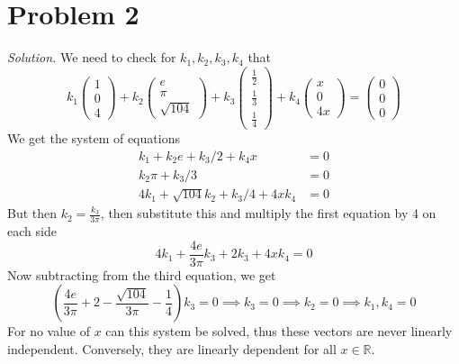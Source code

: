 \documentclass{article}
\begin{document}
\section*{Problem 2}
\emph{Solution. }We need to check for $k_1, k_2, k_3, k_4$ that
\begin{equation*}
    k_{1}\begin{pmatrix}
        1\\
        0\\
        4
    \end{pmatrix} + k_{2}\begin{pmatrix}
        e\\
        \pi \\
        \sqrt{104}
    \end{pmatrix} + k_{3}\begin{pmatrix}
        \frac{1}{2}\\
        \frac{1}{3} \\
        \frac{1}{4}
    \end{pmatrix}  + k_{4}\begin{pmatrix}
        x\\
        0 \\
        4x
    \end{pmatrix} = \begin{pmatrix}
        0\\
        0\\
        0
    \end{pmatrix}
\end{equation*}
We get the system of equations
\begin{align*}
    k_{1} + k_{2}e + k_3/2 + k_{4}x &= 0\\
    k_{2}\pi + k_{3}/3 &= 0\\
    4k_{1} + \sqrt{104}k_{2} + k_{3}/4 + 4xk_{4} &= 0
\end{align*}
But then $k_{2} = \frac{k_{3}}{3\pi}$, then substitute this and multiply the first equation by 4 on each side
\begin{equation*}
    4k_{1} + \frac{4e}{3\pi}k_{3} + 2k_{3} + 4xk_{4} = 0
\end{equation*}
Now subtracting from the third equation, we get
\begin{equation*}
    \left(\frac{4e}{3\pi} + 2 - \frac{\sqrt{104}}{3\pi} - \frac{1}{4}\right)k_{3} = 0 \implies k_{3} = 0 \implies k_{2} = 0 \implies k_{1}, k_{4} = 0
\end{equation*}
For no value of $x$ can this system be solved, thus these vectors are never linearly independent. Conversely, they are linearly dependent for all $x \in \mathbb{R}$. 
\end{document}

